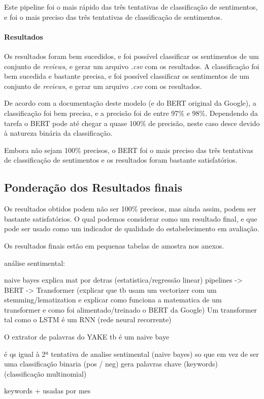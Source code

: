 Este pipeline foi o mais rápido das três tentativas de classificação de sentimentos, e foi o mais preciso das três tentativas de classificação de sentimentos.

\paragraph{Resultados\\}

Os resultados foram bem sucedidos, e foi possível classificar os sentimentos de um conjunto de \textit{reviews}, e gerar um arquivo \textit{.csv} com os resultados. A classificação foi bem sucedida e bastante precisa, e foi possível classificar os sentimentos de um conjunto de \textit{reviews}, e gerar um arquivo \textit{.csv} com os resultados.

De acordo com a documentação deste modelo (e do BERT original da Google), a classificação foi bem precisa, e a precisão foi de entre 97\% e 98\%. Dependendo da tarefa o BERT pode até chegar a quase 100\% de precisão, neste caso desce devido à natureza binária da classificação.

Embora não sejam 100\% precisos, o BERT foi o mais preciso das três tentativas de classificação de sentimentos e os resultados foram bastante satisfatórios.

\subsection{Ponderação dos Resultados finais}

Os resultados obtidos podem não ser 100\% precisos, mas ainda assim, podem ser bastante satisfatórios. O qual podemos considerar como um resultado final, e que pode ser usado como um indicador de qualidade do estabelecimento em avaliação.

Os resultados finais estão em pequenas tabelas de amostra nos anexos.

análise sentimental:

naive bayes explica mat por detras  (estatistica/regressão linear)
pipelines -> BERT -> Transformer (explicar que tb usam um vectorizer com um stemming/lematization e explicar como funciona a matematica de um transformer e como foi alimentado/treinado o BERT da Google)
Um transformer tal como o LSTM é um RNN (rede neural recorrente)

O extrator de palavras do YAKE tb é um naive baye

é qs igual à 2ª tentativa de analise sentimental (naive bayes) so que em vez de ser uma classificação binaria (pos / neg) gera palavras chave (keywords) (classificação multinomial)



keywords + usadas por mes
